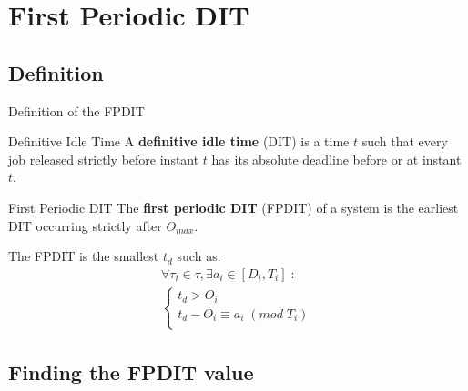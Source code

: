 \documentclass{beamer}
\begin{document}
\section{First Periodic DIT}

    \begin{frame}
    \end{frame}

	\subsection{Definition}

	\begin{frame}{Definition of the FPDIT}
        \begin{block}{Definitive Idle Time}
            A \textbf{definitive idle time} (DIT) \cite{lipariaverage} is a time $t$ such that every job released strictly before instant $t$ has its absolute deadline before or at instant $t$.
        \end{block}

        \begin{block}{First Periodic DIT}
			The \textbf{first periodic DIT} (FPDIT) of a system is the earliest DIT occurring
			strictly after $O_{max}$.
		\end{block}

        The FPDIT is the smallest $t_d$ such as:
       \[
            \begin{array}{l}
                \forall \tau_i \in \tau, \exists a_i \in [D_i,T_i] \; :\\
                \left\{
                    \begin{array}{l}
                        t_d > O_i \\
                        t_d - O_i \equiv a_i \; (mod \; T_i)
                        \\
                    \end{array}
                \right.
            \end{array}
        \]

	\end{frame}

	\subsection{Finding the FPDIT value}
\end{document}
